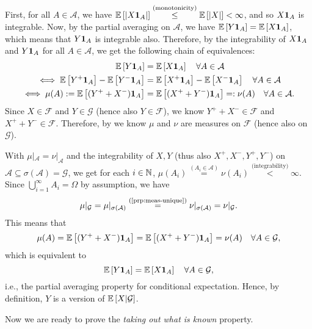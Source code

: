 \begin{enumerate}
\begin{lemma}
\end{lemma}
\begin{pf}
First, for all \(A\in\mathcal{A}\), we have
\(\mathbb{E}\left[|X\mathbf{1}_{A}|\right]\overset{\text{(monotonicity)}}{\le} \mathbb{E}\left[|X|\right]<\infty\),
and so \(X\mathbf{1}_{A}\) is integrable. Now, by the partial averaging on
\(\mathcal{A}\), we have \(\mathbb{E}\left[Y\mathbf{1}_{A}\right]=\mathbb{E}\left[X\mathbf{1}_{A}\right]\),
which means that \(Y\mathbf{1}_{A}\) is integrable also. Therefore, by the
integrability of \(X\mathbf{1}_{A}\) and \(Y\mathbf{1}_{A}\) for all \(A\in\mathcal{A}\),
we get the following chain of equivalences:
\begin{align*}
\quad\mathbb{E}\left[Y\mathbf{1}_{A}\right]&=\mathbb{E}\left[X\mathbf{1}_{A}\right]\quad\forall A\in\mathcal{A} \\
\iff \mathbb{E}\left[Y^{+}\mathbf{1}_{A}\right]-\mathbb{E}\left[Y^{-}\mathbf{1}_{A}\right]
&=\mathbb{E}\left[X^{+}\mathbf{1}_{A}\right]-\mathbb{E}\left[X^{-}\mathbf{1}_{A}\right]\quad \forall A\in\mathcal{A} \\
\iff \mu(A):=\mathbb{E}\left[(Y^{+}+X^{-})\mathbf{1}_{A}\right]
&=\mathbb{E}\left[(X^{+}+Y^{-})\mathbf{1}_{A}\right]=:\nu(A)\quad \forall A\in\mathcal{A}.
\end{align*}
Since \(X\in\mathcal{F}\) and \(Y\in\mathcal{G}\) (hence also
\(Y\in\mathcal{F}\)), we know \(Y^{+}+X^{-}\in\mathcal{F}\) and
\(X^{+}+Y^{-}\in\mathcal{F}\). Therefore, by 
we know \(\mu\) and \(\nu\) are measures on \(\mathcal{F}\) (hence also on
\(\mathcal{G}\)).

With \(\mu|_{\mathcal{A}}=\nu|_{\mathcal{A}}\) and the integrability of \(X,Y\)
(thus also \(X^{+},X^{-},Y^{+},Y^{-}\)) on \(\mathcal{A}\subseteq
\sigma(\mathcal{A})=\mathcal{G}\), we get for each \(i\in\mathbb{N}\),
\(\mu(A_i)\overset{(A_i\in\mathcal{A})}{=}\nu(A_i)
\overset{\text{(integrability)}}{<}\infty\). Since
\(\bigcup_{i=1}^{\infty}A_i=\Omega\) by assumption, we have
\[
\mu|_{\mathcal{G}}=\mu|_{\sigma(\mathcal{A})}
\overset{\text{(\Cref{prp:meas-unique})}}{=}
\nu|_{\sigma(\mathcal{A})}=\nu|_{\mathcal{G}}.
\]
This means that
\[
\mu(A)=\mathbb{E}\left[(Y^{+}+X^{-})\mathbf{1}_{A}\right]
=\mathbb{E}\left[(X^{+}+Y^{-})\mathbf{1}_{A}\right]=\nu(A)\quad \forall A\in\mathcal{G},
\]
which is equivalent to
\[
\mathbb{E}\left[Y\mathbf{1}_{A}\right]=\mathbb{E}\left[X\mathbf{1}_{A}\right]\quad\forall A\in\mathcal{G},
\]
i.e., the partial averaging property for conditional expectation. Hence, by
definition, \(Y\) is a version of \(\mathbb{E}\left[X|\mathcal{G}\right]\).
\end{pf}

Now we are ready to prove the \emph{taking out what is known} property.


\end{enumerate}
